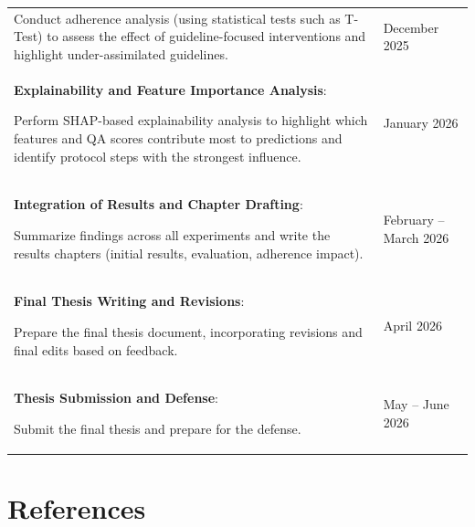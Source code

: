 \documentclass[
]{article}
\begin{document}
{\begin{longtable}[]{@{}
  >{\raggedright\arraybackslash}p{}
  >{\raggedright\arraybackslash}p{}@{}}
Conduct adherence analysis (using statistical tests such as T-Test) to
assess the effect of guideline-focused interventions and highlight
under-assimilated guidelines. & December 2025 \\
\textbf{Explainability and Feature Importance Analysis}:

Perform SHAP-based explainability analysis to highlight which features
and QA scores contribute most to predictions and identify protocol steps
with the strongest influence. & January 2026 \\
\textbf{Integration of Results and Chapter Drafting}:

Summarize findings across all experiments and write the results chapters
(initial results, evaluation, adherence impact). & February -- March
2026 \\
\textbf{Final Thesis Writing and Revisions}:

Prepare the final thesis document, incorporating revisions and final
edits based on feedback. & April 2026 \\
\textbf{Thesis Submission and Defense}:

Submit the final thesis and prepare for the defense. & May -- June
2026 \\
\end{longtable}
}

\section{References}\label{references}
\end{document}
